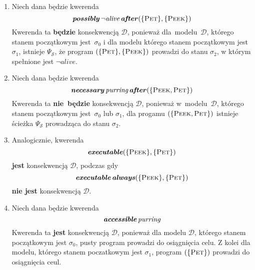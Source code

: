 \documentclass[11pt,a4paper]{article}
\DeclareMathOperator{\After}{\textbf{\textit{after}}}
\DeclareMathOperator{\Always}{\textbf{\textit{always}}}
\DeclareMathOperator{\Executable}{\textbf{\textit{executable}}}
\DeclareMathOperator{\Accessible}{\textbf{\textit{accessible}}}
\DeclareMathOperator{\Possibly}{\textbf{\textit{possibly}}}
\DeclareMathOperator{\Necessary}{\textbf{\textit{necessary}}}
\begin{document}
\begin{enumerate}
    \item Niech dana będzie kwerenda
    $$ \Possibly \neg \textit{alive} \After (\{ \textsc{Pet} \}, \{ \textsc{Peek} \}) $$
    Kwerenda ta \textbf{będzie} konsekwencją $\mathcal{D}$, ponieważ dla~modelu~$\mathcal{D}$, którego stanem początkowym jest~$\sigma_0$ i dla modelu którego stanem początkowym jest $\sigma_1$, istnieje $\Psi_\mathcal{S}$, że program $(\{ \textsc{Pet} \}, \{ \textsc{Peek} \})$ prowadzi do stanu $\sigma_2$, w którym spełnione jest $\neg \textit{alive}$.

    \item Niech dana będzie kwerenda
    $$ \Necessary \textit{purring} \After (\{ \textsc{Peek}, \textsc{Pet} \}) $$
    Kwerenda ta \textbf{nie~będzie} konsekwencją $\mathcal{D}$, ponieważ w~modelu~$\mathcal{D}$, którego stanem początkowym jest~$\sigma_0$ lub $\sigma_1$, dla progamu $(\{ \textsc{Peek}, \textsc{Pet} \})$ istnieje ścieżka $\Psi_\mathcal{S}$ prowadząca   do stanu $\sigma_2$.

    \item Analogicznie, kwerenda
    $$\Executable (\{ \textsc{Peek} \}, \{ \textsc{Pet} \})$$
    \textbf{jest} konsekwencją $\mathcal{D}$, podczas gdy
    $$\Executable \Always (\{ \textsc{Peek} \}, \{ \textsc{Pet} \})$$
    \textbf{nie jest} konsekwencją $\mathcal{D}$.

    \item Niech dana będzie kwerenda
    $$ \Accessible \textit{purring} $$
    Kwerenda ta \textbf{jest} konsekwencją $\mathcal{D}$, ponieważ dla modelu $\mathcal{D}$, którego stanem początkowym jest $\sigma_0$, pusty program prowadzi do osiągnięcia celu. Z kolei dla modelu, którego stanem poczatkowym jest $\sigma_1$, program $(\{\textsc{Pet}\})$ prowadzi do osiągnięcia ceul.
\end{enumerate}
\end{document}
